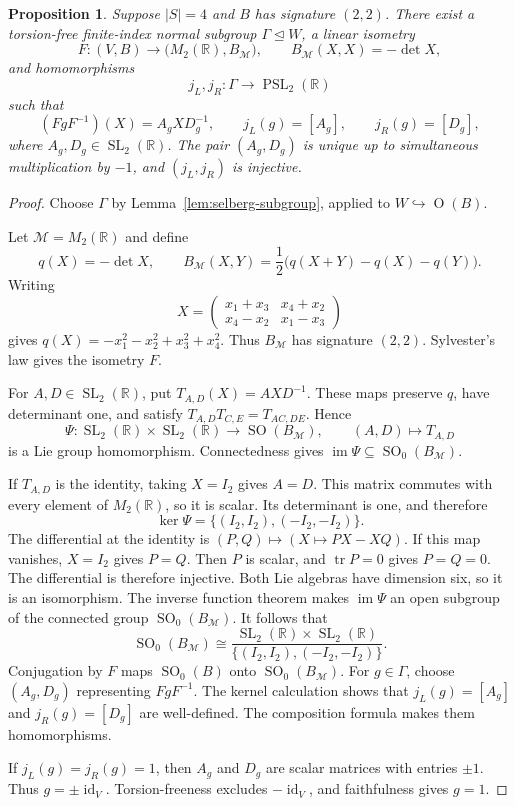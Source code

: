 \documentclass[11pt,reqno]{amsart}
\newcommand{\R}{\mathbb{R}}
\theoremstyle{plain}
\newtheorem{proposition}[theorem]{Proposition}
\theoremstyle{definition}
\theoremstyle{remark}
\numberwithin{equation}{section}
\DeclareMathOperator{\tr}{tr}
\begin{document}
\begin{proposition}\label{prop:matrix-model}
Suppose $|S|=4$ and $B$ has signature $(2,2)$. There exist a torsion-free finite-index normal subgroup $\Gamma\trianglelefteq W$, a linear isometry
\[
F:(V,B)\longrightarrow\bigl(M_2(\R),B_{\mathcal M}\bigr),
\qquad B_{\mathcal M}(X,X)=-\det X,
\]
and homomorphisms
\[
j_L,j_R:\Gamma\longrightarrow\operatorname{PSL}_2(\R)
\]
such that
\[
(FgF^{-1})(X)=A_gXD_g^{-1},\qquad j_L(g)=[A_g],\qquad j_R(g)=[D_g],
\]
where $A_g,D_g\in\operatorname{SL}_2(\R)$. The pair $(A_g,D_g)$ is unique up to simultaneous multiplication by $-1$, and $(j_L,j_R)$ is injective.
\end{proposition}
\begin{proof}
Choose $\Gamma$ by Lemma~\ref{lem:selberg-subgroup}, applied to $W\hookrightarrow\operatorname{O}(B)$.

Let $\mathcal M=M_2(\R)$ and define
\[
q(X)=-\det X,\qquad
B_{\mathcal M}(X,Y)=\frac12\bigl(q(X+Y)-q(X)-q(Y)\bigr).
\]
Writing
\[
X=\begin{pmatrix}x_1+x_3&x_4+x_2\\x_4-x_2&x_1-x_3\end{pmatrix}
\]
gives $q(X)=-x_1^2-x_2^2+x_3^2+x_4^2$. Thus $B_{\mathcal M}$ has signature $(2,2)$. Sylvester's law gives the isometry $F$.

For $A,D\in\operatorname{SL}_2(\R)$, put $T_{A,D}(X)=AXD^{-1}$. These maps preserve $q$, have determinant one, and satisfy $T_{A,D}T_{C,E}=T_{AC,DE}$. Hence
\[
\Psi:\operatorname{SL}_2(\R)\times\operatorname{SL}_2(\R)
\longrightarrow\operatorname{SO}(B_{\mathcal M}),\qquad
(A,D)\longmapsto T_{A,D}
\]
is a Lie group homomorphism. Connectedness gives $\operatorname{im}\Psi\subseteq\operatorname{SO}_0(B_{\mathcal M})$.

If $T_{A,D}$ is the identity, taking $X=I_2$ gives $A=D$. This matrix commutes with every element of $M_2(\R)$, so it is scalar. Its determinant is one, and therefore
\[
\ker\Psi=\{(I_2,I_2),(-I_2,-I_2)\}.
\]
The differential at the identity is $(P,Q)\mapsto(X\mapsto PX-XQ)$. If this map vanishes, $X=I_2$ gives $P=Q$. Then $P$ is scalar, and $\tr P=0$ gives $P=Q=0$. The differential is therefore injective. Both Lie algebras have dimension six, so it is an isomorphism. The inverse function theorem makes $\operatorname{im}\Psi$ an open subgroup of the connected group $\operatorname{SO}_0(B_{\mathcal M})$. It follows that
\[
\operatorname{SO}_0(B_{\mathcal M})\cong
\frac{\operatorname{SL}_2(\R)\times\operatorname{SL}_2(\R)}
{\{(I_2,I_2),(-I_2,-I_2)\}}.
\]
Conjugation by $F$ maps $\operatorname{SO}_0(B)$ onto $\operatorname{SO}_0(B_{\mathcal M})$. For $g\in\Gamma$, choose $(A_g,D_g)$ representing $FgF^{-1}$. The kernel calculation shows that $j_L(g)=[A_g]$ and $j_R(g)=[D_g]$ are well-defined. The composition formula makes them homomorphisms.

If $j_L(g)=j_R(g)=1$, then $A_g$ and $D_g$ are scalar matrices with entries $\pm1$. Thus $g=\pm\operatorname{id}_V$. Torsion-freeness excludes $-\operatorname{id}_V$, and faithfulness gives $g=1$.
\end{proof}
\end{document}
